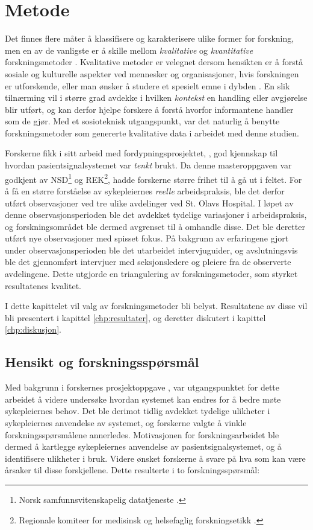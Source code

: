 \chapter{Metode}
\label{chp:metode} 

Det finnes flere måter å klassifisere og karakterisere ulike former for forskning, men en av de vanligste er å skille mellom \textit{kvalitative} og \textit{kvantitative} forskningsmetoder \citep{Myers13, Tjora}. Kvalitative metoder er velegnet dersom hensikten er å forstå sosiale og kulturelle aspekter ved mennesker og organisasjoner, hvis forskningen er utforskende, eller man ønsker å studere et spesielt emne i dybden \citep{Myers13}. En slik tilnærming vil i større grad avdekke i hvilken \textit{kontekst} en handling eller avgjørelse blir utført, og kan derfor hjelpe forskere å forstå hvorfor informantene handler som de gjør. Med et sosioteknisk utgangspunkt, var det naturlig å benytte forskningsmetoder som genererte kvalitative data i arbeidet med denne studien.

\noindent
Forskerne fikk i sitt arbeid med fordypningsprosjektet, \citep{Sund13}, god kjennskap til hvordan pasientsignalsystemet var \textit{tenkt} brukt. Da denne masteroppgaven var godkjent av NSD\footnote{Norsk samfunnsvitenskapelig datatjeneste \citep{NSD}.} og REK\footnote{Regionale komiteer for medisinsk og helsefaglig forskningsetikk \citep{REK}.}, hadde forskerne større frihet til å gå ut i feltet. For å få en større forståelse av sykepleiernes \textit{reelle} arbeidspraksis, ble det derfor utført observasjoner ved tre ulike avdelinger ved St. Olavs Hospital. I løpet av denne observasjonsperioden ble det avdekket tydelige variasjoner i arbeidspraksis, og forskningsområdet ble dermed avgrenset til å omhandle disse. Det ble deretter utført nye observasjoner med spisset fokus. På bakgrunn av erfaringene gjort under observasjonsperioden ble det utarbeidet intervjuguider, og avslutningsvis ble det gjennomført intervjuer med seksjonsledere og pleiere fra de observerte avdelingene. Dette utgjorde en triangulering av forskningsmetoder, som styrket resultatenes kvalitet.

\noindent
I dette kapittelet vil valg av forskningsmetoder bli belyst. Resultatene av disse vil bli presentert i kapittel \ref{chp:resultater}, og deretter diskutert i kapittel \ref{chp:diskusjon}. 

\section{Hensikt og forskningsspørsmål}
Med bakgrunn i forskernes prosjektoppgave \citep{Sund13}, var utgangspunktet for dette arbeidet å videre undersøke hvordan systemet kan endres for å bedre møte sykepleiernes behov. Det ble derimot tidlig avdekket tydelige ulikheter i sykepleiernes anvendelse av systemet, og forskerne valgte å vinkle forskningsspørsmålene annerledes. Motivasjonen for forskningsarbeidet ble dermed å kartlegge sykepleiernes anvendelse av pasientsignalsystemet, og å identifisere ulikheter i bruk. Videre ønsket forskerne å svare på hva som kan være årsaker til disse forskjellene. Dette resulterte i to forskningsspørsmål:

